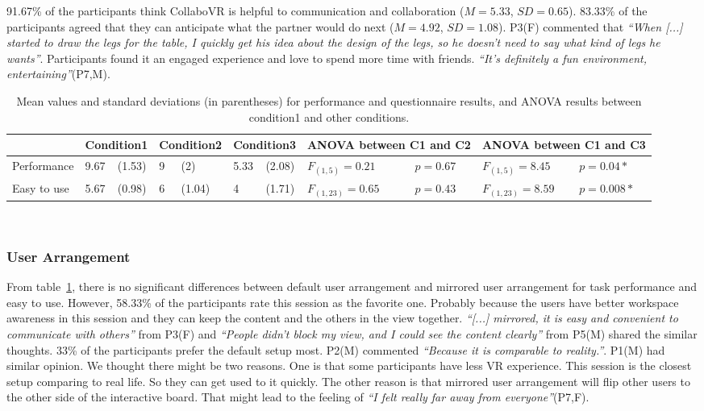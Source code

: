 \documentclass{sigchi}
\begin{document}
91.67\% of the participants think CollaboVR is helpful to communication and collaboration ($M=5.33$, $SD=0.65$). 
83.33\% of the participants agreed that they can anticipate what the partner would do next ($M=4.92$, $SD=1.08$). P3(F) commented that \textit{``When [...] started to draw the legs for the table, I quickly get his idea about the design of the legs, so he doesn't need to say what kind of legs he wants''}. Participants found it an engaged experience and love to spend more time with friends. \textit{``It's definitely a fun environment, entertaining''}(P7,M).

\begin{table}
  \centering
  \begin{tabular}{l l l l l l l l l l l}
    & \multicolumn{2}{c}{Condition1} & \multicolumn{2}{c}{Condition2} & \multicolumn{2}{c}{Condition3} & \multicolumn{2}{c}{ANOVA between C1 and C2} & \multicolumn{2}{c}{ANOVA between C1 and C3} \\
    \midrule
    Performance & 9.67 & (1.53) & 9 & (2) & 5.33 & (2.08) & $F_{(1,5)} = 0.21$ & $p = 0.67$ & $F_{(1,5)} =8.45$ & $p = 0.04*$\\
    Easy to use & 5.67 & (0.98) & 6 & (1.04) & 4 & (1.71) & $F_{(1,23)}=0.65$ & $p=0.43$ & $F_{(1,23)}=8.59$ & $p=0.008*$\\
  \end{tabular}
  \caption{Mean values and standard deviations (in parentheses) for performance and questionnaire results, and ANOVA results between condition1 and other conditions.}~\label{tab:result}
\end{table}

\subsubsection{User Arrangement}
From table~\ref{tab:result}, there is no significant differences between default user arrangement and mirrored user arrangement for task performance and easy to use. However, 58.33\% of the participants rate this session as the favorite one. Probably because the users have better workspace awareness in this session and they can keep the content and the others in the view together. \textit{``[...] mirrored, it is easy and convenient to communicate with others''} from P3(F) and \textit{``People didn't block my view, and I could see the content clearly''} from P5(M) shared the similar thoughts. 33\% of the participants prefer the default setup most. P2(M) commented \textit{``Because it is comparable to reality.''}. P1(M) had similar opinion. We thought there might be two reasons. One is that some participants have less VR experience. This session is the closest setup comparing to real life. So they can get used to it quickly. The other reason is that mirrored user arrangement will flip other users to the other side of the interactive board. That might lead to the feeling of \textit{``I felt really far away from everyone''}(P7,F).
\end{document}

